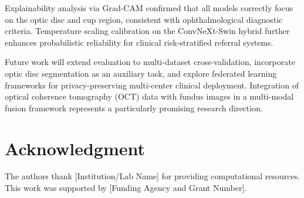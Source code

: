 \documentclass[conference]{IEEEtran}
\begin{document}
Explainability analysis via Grad-CAM confirmed 
that all models correctly focus on the optic 
disc and cup region, consistent with 
ophthalmological diagnostic criteria. 
Temperature scaling calibration on the 
ConvNeXt-Swin hybrid further enhances 
probabilistic reliability for clinical 
risk-stratified referral systems.

Future work will extend evaluation to 
multi-dataset cross-validation, incorporate 
optic disc segmentation as an auxiliary task, 
and explore federated learning frameworks 
for privacy-preserving multi-center clinical 
deployment. Integration of optical coherence 
tomography (OCT) data with fundus images 
in a multi-modal fusion framework represents 
a particularly promising research direction.


\section*{Acknowledgment}

The authors thank [Institution/Lab Name] for 
providing computational resources. This work 
was supported by [Funding Agency and Grant Number].




\end{document}
